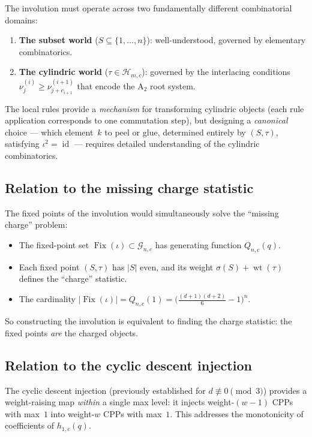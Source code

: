 \documentclass[11pt]{article}
\theoremstyle{plain}
\theoremstyle{definition}
\begin{document}
The involution must operate across two fundamentally different
combinatorial domains:

\begin{enumerate}
  \item \textbf{The subset world} ($S \subseteq \{1, \ldots, n\}$):
    well-understood, governed by elementary combinatorics.
  \item \textbf{The cylindric world} ($\tau \in \mathcal{H}_{m,c}$):
    governed by the interlacing conditions
    $\nu^{(i)}_j \geq \nu^{(i+1)}_{j+c_{i+1}}$ that encode the
    $\mathrm{A}_2$ root system.
\end{enumerate}

The local rules provide a \emph{mechanism} for transforming
cylindric objects (each rule application corresponds to one
commutation step), but designing a \emph{canonical} choice ---
which element~$k$ to peel or glue, determined entirely by
$(S, \tau)$, satisfying $\iota^2 = \operatorname{id}$ --- requires
detailed understanding of the cylindric combinatorics.

\subsection{Relation to the missing charge statistic}

The fixed points of the involution would simultaneously solve
the ``missing charge'' problem:

\begin{itemize}
  \item The fixed-point set
    $\operatorname{Fix}(\iota) \subset \mathcal{G}_{n,c}$ has
    generating function $Q_{n,c}(q)$.
  \item Each fixed point $(S, \tau)$ has $|S|$ even, and its
    weight $\sigma(S) + \operatorname{wt}(\tau)$ defines the
    ``charge'' statistic.
  \item The cardinality
    $|\operatorname{Fix}(\iota)| = Q_{n,c}(1)
    = \bigl(\frac{(d+1)(d+2)}{6} - 1\bigr)^n$.
\end{itemize}

So constructing the involution is equivalent to finding the
charge statistic: the fixed points \emph{are} the charged objects.

\subsection{Relation to the cyclic descent injection}

The cyclic descent injection (previously established for
$d \not\equiv 0 \pmod{3}$) provides a weight-raising map
\emph{within} a single max level: it injects weight-$(w-1)$
CPPs with max~$1$ into weight-$w$ CPPs with max~$1$.
This addresses the monotonicity of coefficients of $h_{1,c}(q)$.
\end{document}
